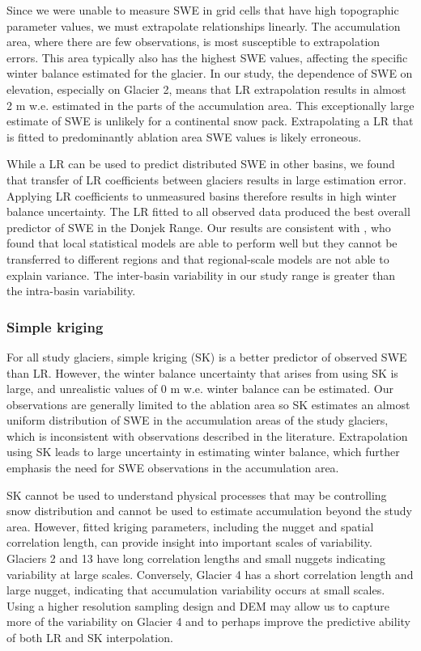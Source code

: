 \documentclass[twocolumn, letterpaper]{igs}
\begin{document}
Since we were unable to measure SWE in grid cells that have high topographic parameter values, we must extrapolate relationships linearly. The accumulation area, where there are few observations, is most susceptible to extrapolation errors. This area typically also has the highest SWE values, affecting the specific winter balance estimated for the glacier. In our study, the dependence of SWE on elevation, especially on Glacier 2, means that LR extrapolation results in almost 2 m w.e. estimated in the parts of the accumulation area. This exceptionally large estimate of SWE is unlikely for a continental snow pack. Extrapolating a LR that is fitted to predominantly ablation area SWE values is likely erroneous. 

While a LR can be used to predict distributed SWE in other basins, we found that transfer of LR coefficients between glaciers results in large estimation error. Applying LR coefficients to unmeasured basins therefore results in high winter balance uncertainty. The LR fitted to all observed data produced the best overall predictor of SWE in the Donjek Range. Our results are consistent with \cite{Grunewald2013}, who found that local statistical models are able to perform well but  they cannot be transferred to different regions and that regional-scale models are not able to explain variance. The inter-basin variability in our study range is greater than the intra-basin variability. 

\subsubsection{Simple kriging}

For all study glaciers, simple kriging (SK) is a better predictor of observed SWE than LR. However, the winter balance uncertainty that arises from using SK is large, and unrealistic values of 0 m w.e. winter balance can be estimated. Our observations are generally limited to the ablation area so SK estimates an almost uniform distribution of SWE in the accumulation areas of the study glaciers, which is inconsistent with observations described in the literature. Extrapolation using SK leads to large uncertainty in estimating winter balance, which further emphasis the need for SWE observations in the accumulation area. 

SK cannot be used to understand physical processes that may be controlling snow distribution and cannot be used to estimate accumulation beyond the study area. However, fitted kriging parameters, including the nugget and spatial correlation length, can provide insight into important scales of variability. Glaciers 2 and 13 have long correlation lengths and small nuggets indicating variability at large scales. Conversely, Glacier 4 has a short correlation length and large nugget, indicating that accumulation variability occurs at small scales. Using a higher resolution sampling design and DEM may allow us to capture more of the variability on Glacier 4 and to perhaps improve the predictive ability of both LR and SK interpolation. 
\end{document}
